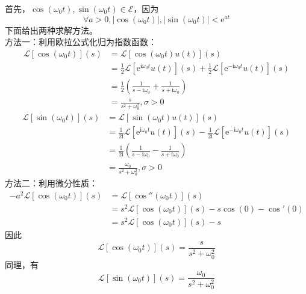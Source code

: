 \begin{example}[正弦、余弦函数]
    首先，$\cos(\omega_0 t),\sin(\omega_0 t)\in\mathcal{E}$，因为$$\forall a>0,|\cos(\omega_0 t)|,|\sin(\omega_0 t)|<\mathrm{e}^{a t}$$
    下面给出两种求解方法。\\
    方法一：利用欧拉公式化归为指数函数：
    \begin{align*}
        \mathcal{L}[\cos(\omega_0 t)](s)&=\mathcal{L}[\cos(\omega_0 t)u(t)](s)\\
        &=\frac{1}{2}\mathcal{L} [\mathrm{e}^{\mathrm{i}\omega_0 t}u(t)](s)+\frac{1}{2}\mathcal{L} [\mathrm{e}^{-\mathrm{i}\omega_0 t}u(t)](s)\\
        &=\frac{1}{2}\left(\frac{1}{s-\mathrm{i}\omega_0}+\frac{1}{s+\mathrm{i}\omega_0}\right)\\
        &=\frac{s}{s^2+\omega_0^2},\sigma>0
    \end{align*}
    \begin{align*}
        \mathcal{L}[\sin(\omega_0 t)](s)&=\mathcal{L} [\sin(\omega_0 t)u(t)](s)\\
        &=\frac{1}{2\mathrm{i}}\mathcal{L} [\mathrm{e}^{\mathrm{i}\omega_0 t}u(t)](s)-\frac{1}{2\mathrm{i}}\mathcal{L} [\mathrm{e}^{-\mathrm{i}\omega_0 t}u(t)](s)\\
        &=\frac{1}{2\mathrm{i}}\left(\frac{1}{s-\mathrm{i}\omega_0}-\frac{1}{s+\mathrm{i}\omega_0}\right)\\
        &=\frac{\omega_0}{s^2+\omega_0^2},\sigma>0
    \end{align*}
    方法二：利用微分性质：
    \begin{align*}
        -a^2\mathcal{L}[\cos(\omega_0 t)](s)&=\mathcal{L} [\cos''(\omega_0 t)](s)\\
        &=s^2\mathcal{L} [\cos(\omega_0 t)](s)-s\cos(0)-\cos'(0)\\
        &=s^2\mathcal{L} [\cos(\omega_0 t)](s)-s
    \end{align*}
    因此\[\mathcal{L} [\cos(\omega_0 t)](s)=\frac{s}{s^2+\omega_0^2}\]
    同理，有\[\mathcal{L} [\sin(\omega_0 t)](s)=\frac{\omega_0}{s^2+\omega_0^2}\]
\end{example}

